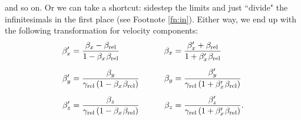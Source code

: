 \documentclass[12pt]{article}
\begin{document}
and so on. Or we can take a shortcut: sidestep the limits and just ``divide" the infinitesimals in the first place (see Footnote \ref{fn:in}). Either way, we end up with the following transformation for velocity components:
\begin{equation}\label{eq:vt}
\begin{aligned}
\beta_x^{\prime} &= \frac{\beta_x - \beta_{\textrm{rel}}}{1 - \beta_{x} \mkern1mu \beta_{\textrm{rel}}}& \qquad \beta_x &= \frac{\beta_x^{\prime} + \beta_{\textrm{rel}}}{1 + \beta_x^{\prime} \mkern1mu \beta_{\textrm{rel}}}\\[5pt]
\beta_y^{\prime} &= \frac{\beta_y}{\gamma_{\textrm{rel}} \left( 1 - \beta_{x} \mkern1mu \beta_{\textrm{rel}} \right)}& \qquad \beta_y &= \frac{\beta_y^{\prime}}{\gamma_{\textrm{rel}} \left( 1 + \beta_x^{\prime} \mkern1mu \beta_{\textrm{rel}} \right) }\\[5pt]
\beta_z^{\prime} &= \frac{\beta_z}{\gamma_{\textrm{rel}} \left( 1 - \beta_{x} \mkern1mu \beta_{\textrm{rel}} \right)}& \qquad \beta_z &= \frac{\beta_z^{\prime}}{\gamma_{\textrm{rel}} \left( 1 + \beta_x^{\prime} \mkern1mu \beta_{\textrm{rel}} \right)}.
\end{aligned}
\end{equation}
\end{document}
